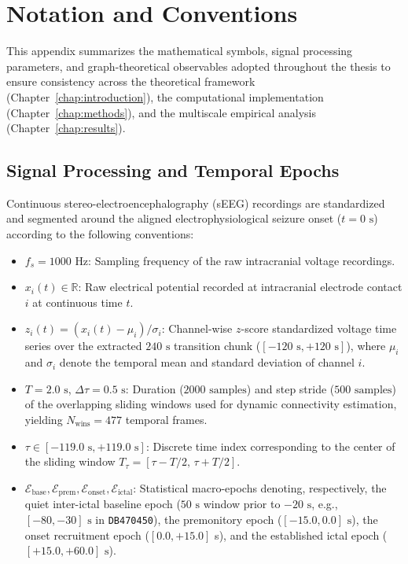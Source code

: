 \section{Notation and Conventions}
\label{app:notation}

This appendix summarizes the mathematical symbols, signal processing parameters, and graph-theoretical observables adopted throughout the thesis to ensure consistency across the theoretical framework (Chapter~\ref{chap:introduction}), the computational implementation (Chapter~\ref{chap:methods}), and the multiscale empirical analysis (Chapter~\ref{chap:results}).

\subsection{Signal Processing and Temporal Epochs}
Continuous stereo-electroencephalography (sEEG) recordings are standardized and segmented around the aligned electrophysiological seizure onset ($t = 0\text{ s}$) according to the following conventions:

\begin{itemize}
    \item $f_s = 1000\text{ Hz}$: Sampling frequency of the raw intracranial voltage recordings.
    \item $x_i(t) \in \mathbb{R}$: Raw electrical potential recorded at intracranial electrode contact $i$ at continuous time $t$.
    \item $z_i(t) = (x_i(t) - \mu_i)/\sigma_i$: Channel-wise $z$-score standardized voltage time series over the extracted $240\text{ s}$ transition chunk ($[-120\text{ s}, +120\text{ s}]$), where $\mu_i$ and $\sigma_i$ denote the temporal mean and standard deviation of channel $i$.
    \item $T = 2.0\text{ s}$, $\Delta \tau = 0.5\text{ s}$: Duration ($2000\text{ samples}$) and step stride ($500\text{ samples}$) of the overlapping sliding windows used for dynamic connectivity estimation, yielding $N_\text{wins} = 477$ temporal frames.
    \item $\tau \in [-119.0\text{ s}, +119.0\text{ s}]$: Discrete time index corresponding to the center of the sliding window $T_\tau = [\tau - T/2, \, \tau + T/2]$.
    \item $\mathcal{E}_{\text{base}}, \mathcal{E}_{\text{prem}}, \mathcal{E}_{\text{onset}}, \mathcal{E}_{\text{ictal}}$: Statistical macro-epochs denoting, respectively, the quiet inter-ictal baseline epoch ($50\text{ s}$ window prior to $-20\text{ s}$, e.g., $[-80, -30]\text{ s}$ in \texttt{DB470450}), the premonitory epoch ($[-15.0, 0.0]\text{ s}$), the onset recruitment epoch ($[0.0, +15.0]$ s), and the established ictal epoch ($[+15.0, +60.0]\text{ s}$).
\end{itemize}

